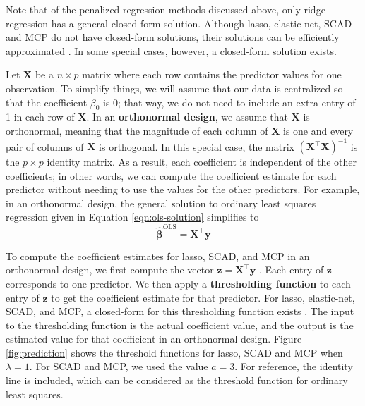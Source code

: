 \documentclass{article}
\begin{document}
	Note that of the penalized regression methods discussed above, only ridge regression has a general closed-form solution. Although lasso, elastic-net, SCAD and MCP do not have closed-form solutions, their solutions can be efficiently approximated \cite{friedman2010regularization, breheny2011ncvreg}. In some special cases, however, a closed-form solution exists. 
	
	Let $\mathbf{X}$ be a $n\times p$ matrix where each row contains the predictor values for one observation. To simplify things, we will assume that our data is centralized so that the coefficient $\beta_0$ is 0; that way, we do not need to include an extra entry of 1 in each row of $\mathbf{X}$. In an \textbf{orthonormal design}, we assume that $\mathbf{X}$ is orthonormal, meaning that the magnitude of each column of $\mathbf{X}$ is one and every pair of columns of $\mathbf{X}$ is orthogonal. In this special case, the matrix $(\mathbf{X}^\top \mathbf{X})^{-1}$ is the $p\times p$ identity matrix. As a result, each coefficient is independent of the other coefficients; in other words, we can compute the coefficient estimate for each predictor without needing to use the values for the other predictors. For example, in an orthonormal design, the general solution to ordinary least squares regression given in Equation \ref{eqn:ols-solution} simplifies to
	\begin{equation}\label{ols-orthonormal-solution}
		\hat{\bm{\beta}}^{\text{OLS}} = \mathbf{X}^\top \mathbf{y}
	\end{equation}
	
	To compute the coefficient estimates for lasso, SCAD, and MCP in an orthonormal design, we first compute the vector $\mathbf{z} = \mathbf{X}^\top \mathbf{y}$ \cite{fan2001variable}. Each entry of $\mathbf{z}$ corresponds to one predictor. We then apply a \textbf{thresholding function} to each entry of $\mathbf{z}$ to get the coefficient estimate for that predictor. For lasso, elastic-net, SCAD, and MCP, a closed-form for this thresholding function exists \cite{tibshirani1996regression, fan2001variable, zou2005regularization, zhang2010nearly}. The input to the thresholding function is the actual coefficient value, and the output is the estimated value for that coefficient in an orthonormal design. Figure \ref{fig:prediction} shows the threshold functions for lasso, SCAD and MCP when $\lambda = 1$. For SCAD and MCP, we used the value $a = 3$. For reference, the identity line is included, which can be considered as the threshold function for ordinary least squares.
	
\end{document}
